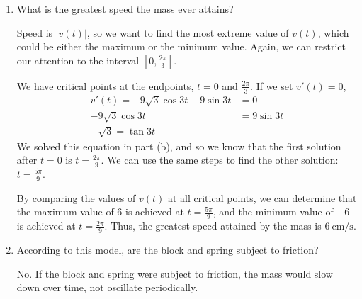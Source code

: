 \documentclass[main]{subfiles}
\begin{document}
\begin{enumerate}
\begin{enumerate}
\begin{solution}
        By comparing the values of $x(t)$ at all critical points, we
        can determine that the maximum value of $2$ is attained at
        $t=\frac{\pi}{18}$ and the minimum value of $-2$ is attained at
        $t=\frac{7\pi}{18}$. Therefore the farthest the mass can travel
        is \fbox{2 cm} away from the equilibrium position.
      \end{solution}

    \item
      \begin{problem}[\vfill]
        What is the greatest speed the mass ever attains?
      \end{problem}

      \begin{solution}
        Speed is $|v(t)|$, so we want to find the most extreme
        value of $v(t)$,  which could be either the maximum or 
        the minimum value. Again, we can restrict our attention to
        the interval $[0,\frac{2\pi}{3}]$.

        We have critical points at the endpoints, $t=0$ and 
        $\frac{2\pi}{3}$. If we set $v'(t)=0$,
        \begin{align*}
        v'(t) = -9\sqrt3 \cos 3t - 9 \sin 3t &= 0 \\
        -9\sqrt 3 \cos 3t &= 9 \sin 3t \\
        -\sqrt3 = \tan 3t
        \end{align*}
        We solved this equation in part (b), and so we know that
        the first solution after $t=0$ is $t=\frac{2\pi}{9}$. 
        We can use the same steps to find the other solution:
        $t=\frac{5\pi}{9}$.

        By comparing the values of $v(t)$ at all critical points,
        we can determine that the maximum value of $6$ is achieved at
        $t= \frac{5\pi}{9}$, and the minimum value of $-6$ is achieved
        at $t=\frac{2\pi}{9}$. Thus, the greatest speed attained
        by the mass is $\SI{6}{\centi\meter\per\second}$.
      \end{solution}

    \item

      \begin{problem}[\vfill]
        According to this model, are the block and spring subject to
        friction?
      \end{problem}

      \begin{solution}
        No. If the block and spring were subject to friction, the mass
        would slow down over time, not oscillate periodically.
      \end{solution}


\end{enumerate}
\end{enumerate}
\end{document}
